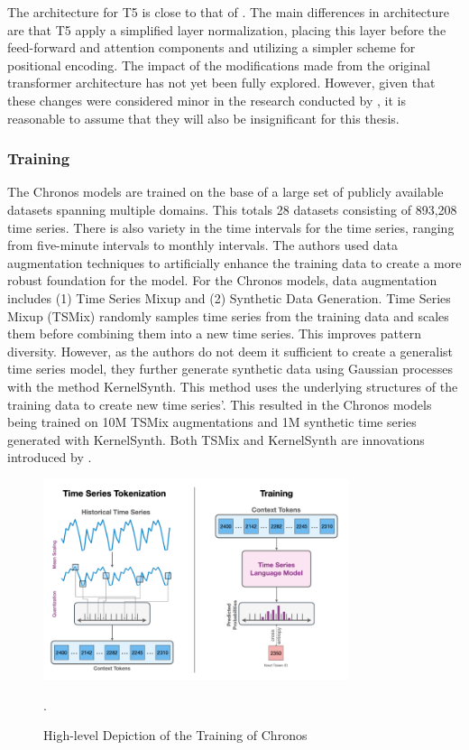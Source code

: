 \documentclass[12pt,a4paper]{article}
\begin{document}
The architecture for T5 is close to that of \cite{Vaswani2017}. The main differences in architecture are that T5 apply a simplified layer normalization, placing this layer before the feed-forward and attention components and utilizing a simpler scheme for positional encoding. The impact of the modifications made from the original transformer architecture has not yet been fully explored. However, given that these changes were considered minor in the research conducted by \cite{Raffel2019}, it is reasonable to assume that they will also be insignificant for this thesis.

\subsubsection{Training}

The Chronos models are trained on the base of a large set of publicly available datasets spanning multiple domains. This totals 28 datasets consisting of 893,208 time series. There is also variety in the time intervals for the time series, ranging from five-minute intervals to monthly intervals. The authors used data augmentation techniques to artificially enhance the training data to create a more robust foundation for the model. For the Chronos models, data augmentation includes (1) Time Series Mixup and (2) Synthetic Data Generation. Time Series Mixup (TSMix) randomly samples time series from the training data and scales them before combining them into a new time series. This improves pattern diversity. However, as the authors do not deem it sufficient to create a generalist time series model, they further generate synthetic data using Gaussian processes with the method KernelSynth. This method uses the underlying structures of the training data to create new time series'. This resulted in the Chronos models being trained on 10M TSMix augmentations and 1M synthetic time series generated with KernelSynth. Both TSMix and KernelSynth are innovations introduced by \cite{ansari2024chronos}.

\begin{figure}[htbp]
  \centering
  \includegraphics[width=0.8\textwidth]{chronos_training.png}
  \caption{High-level Depiction of the Training of Chronos \parencite{ansari2024chronos}}.
  \label{chronostraining}
\end{figure}
\end{document}
